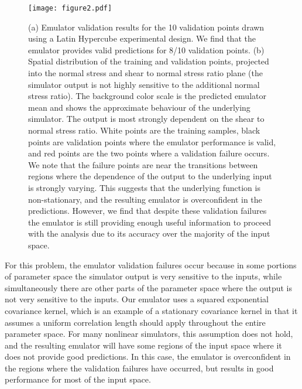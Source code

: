 \documentclass[openacc]{rstransa}%
\begin{document}
\begin{figure}[!h]
\centering\texttt{[image: figure2.pdf]}
\caption{(a) Emulator validation results for the 10 validation points
  drawn using a Latin Hypercube experimental design. We find that the
  emulator provides valid predictions for 8/10 validation points.
  (b) Spatial distribution of the training and validation points, projected
  into the normal stress and shear to normal stress ratio plane (the
  simulator output is not highly sensitive to the additional normal
  stress ratio).
  The background color scale is the predicted emulator mean and shows the
  approximate behaviour of the underlying simulator. The output is
  most strongly dependent on the shear to normal stress ratio. White
  points are the training samples, black points are validation points
  where the emulator performance is valid, and red points are the two
  points where a validation failure occurs. We note that the failure
  points are near the transitions between regions where the dependence
  of the output to the underlying input is strongly varying. This suggests
  that the underlying function is non-stationary, and the resulting
  emulator is overconfident in the predictions. However, we find that despite
  these validation failures the emulator is still providing enough useful
  information to proceed with the analysis due to its accuracy over
  the majority of the input space.}
\label{fig_nroy}
\end{figure}

For this problem, the emulator validation failures occur because
in some portions of parameter space the simulator output
is very sensitive to the inputs, while simultaneously there are other
parts of the parameter space where the output is not very sensitive to
the inputs. Our emulator uses a squared exponential covariance kernel, which
is an example of a stationary covariance kernel in that it assumes a uniform
correlation length should apply throughout the entire parameter space.
For many nonlinear simulators, this assumption does not hold, and the resulting
emulator will have some regions of the input space where it does not
provide good predictions. In this case, the emulator is overconfident in
the regions where the validation failures have occurred, but results in good
performance for most of the input space.
\end{document}
